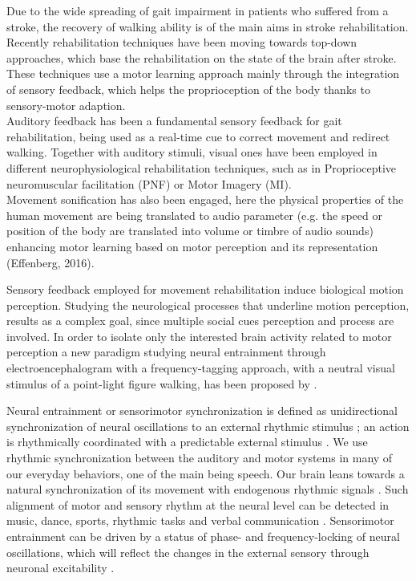 Due to the wide spreading of gait impairment in patients who suffered from a stroke, the recovery of walking ability is of the main aims in stroke rehabilitation. Recently rehabilitation techniques have been moving towards top-down approaches, which base the rehabilitation on the state of the brain after stroke. These techniques use a motor learning approach mainly through the integration of sensory feedback, which helps the proprioception of the body thanks to sensory-motor adaption. \\
Auditory feedback has been a fundamental sensory feedback for gait rehabilitation, being used as a real-time cue to correct movement and redirect walking. Together with auditory stimuli, visual ones have been employed in different neurophysiological rehabilitation techniques, such as in Proprioceptive neuromuscular facilitation (PNF) or Motor Imagery (MI). \\
Movement sonification has also been engaged, here the physical properties of the human movement are being translated to audio parameter (e.g. the speed or position of the body are translated into volume or timbre of audio sounds) enhancing motor learning based on motor perception and its representation (Effenberg, 2016).  

Sensory feedback employed for movement rehabilitation induce biological motion perception. Studying the neurological processes that underline motion perception, results as a complex goal, since multiple social cues perception and process are involved. In order to isolate only the interested brain activity related to motor perception a new paradigm studying neural entrainment through electroencephalogram with a frequency-tagging approach, with a neutral visual stimulus of a point-light figure walking, has been proposed by \cite{Cracco_2022}. 

Neural entrainment or sensorimotor synchronization is defined as unidirectional synchronization of neural oscillations to an external rhythmic stimulus \parencite{Lakatos_2019, Haegens_2018}; an action is rhythmically coordinated with a predictable external stimulus \parencite{Pressing_1999}. We use rhythmic synchronization between the auditory and motor systems in many of our everyday behaviors, one of the main being speech. Our brain leans towards a natural synchronization of its movement with endogenous rhythmic signals \parencite{Large_2009}. Such alignment of motor and sensory rhythm at the neural level can be detected in music, dance, sports, rhythmic tasks and verbal communication \parencite{Rosso_2023}. Sensorimotor entrainment can be driven by a status of phase- and frequency-locking of neural oscillations, which will reflect the changes in the external sensory through neuronal excitability  \parencite{Lakatos_2005}. 

